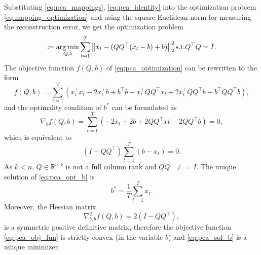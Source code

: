 Substituting \eqref{eq:pca_mappings}, \eqref{eq:pca_identity} into the optimization problem \eqref{eq:mapping_optimization} and using the square Euclidean norm for measuring the reconstruction error, we get the optimization problem
\begin{equation}
    [Q^{*}, b^{*}] \coloneqq \argmin_{Q,b} \sum_{t=1}^T \norm{x_t - (QQ^{\top}(x_t-b) + b)}^2_2 \text{s.t.} Q^{\top}Q=I.
    \label{eq:pca_optimization}
\end{equation}
The objective function $f(Q,b)$ of \eqref{eq:pca_optimization} can be rewritten to the form
\begin{equation}
    f(Q,b)=\sum_{t=1}^T (x_t^{\top}x_t - 2 x_t^{\top}b + b^{\top}b - x_t^{\top}QQ^{\top}x_t + 2x_t^{\top}QQ^{\top}b - b^{\top}QQ^{\top}b),
    \label{eq:pca_obj_fun}
\end{equation}
and the optimality condition of $b^{*}$ can be formulated as
\begin{equation}
    \nabla_bf(Q,b) = \sum_{t=1}^T(-2x_t+2b+2QQ^{\top}xt-2QQ^{\top}b)=0,
\end{equation}
which is equivalent to
\begin{equation}
    (I-QQ^{\top})\sum_{t=1}^T(b-x_t)=0.
    \label{eq:pca_opt_b}
\end{equation}
As $k<n$, $Q \in \mathbb{R}^{n,k}$ is not a full column rank and $QQ^{\top} \neq = I$. The unique solution of \eqref{eq:pca_opt_b} is
\begin{equation}
    b^{*} = \frac{1}{T}\sum_{t=1}^T x_t.
\end{equation}
Moreover, the Hessian matrix
\begin{equation}
    \nabla_{b,b}^2 f(Q,b)=2(I-QQ^{\top}),
    \label{eq:pca_sol_b}
\end{equation}
is a symmetric positive definitive matrix, therefore the objective function \eqref{eq:pca_obj_fun} is strictly convex (in the variable $b$) and \eqref{eq:pca_sol_b} is a unique minimizer.

